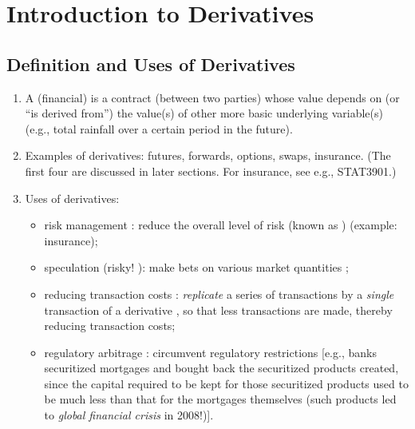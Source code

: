 \section{Introduction to Derivatives}
\subsection{Definition and Uses of Derivatives}
\begin{enumerate}
\item A (financial)  is a contract  (between
two parties) whose value depends on (or ``is derived from'') the value(s) of
other more basic underlying variable(s) (e.g., total rainfall 
over a certain period in the future).

\item Examples of derivatives: futures, forwards, options, swaps, insurance.
(The first four are discussed in later sections. For insurance, see e.g.,
STAT3901.)

\item Uses of derivatives:
\begin{itemize}
\item risk management : reduce the overall level of risk
 (known as ) (example: insurance);

\item speculation  (risky!
{\color{red}}): make bets  on
various market quantities ;

\item reducing transaction costs 
: \emph{replicate}  a
series of transactions
  
by a \emph{single} transaction  of a derivative
, so that less transactions are made, thereby reducing
transaction costs;

\item regulatory arbitrage : circumvent regulatory
restrictions  [e.g., banks  securitized mortgages
 and bought back the securitized products created, since the
capital required to be kept for those securitized products used to be much less
than that for the mortgages themselves \parencite[Section~8.3]{hull2022options}
(such products led to \emph{global financial crisis}  in 2008!)].
\end{itemize}
\end{enumerate}

